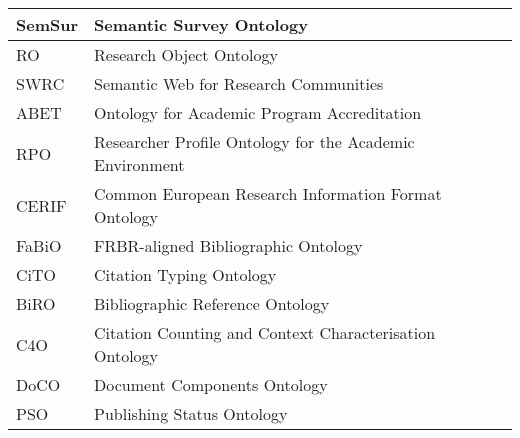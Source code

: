 \begin{table}[]
\begin{tabular}{llr}
SemSur        & Semantic Survey Ontology & \cite{DBLP:conf/i-semantics/FathallaVA018}                          \\ \midrule
RO            & Research Object Ontology & \cite{DBLP:journals/corr/BelhajjameZGHPCGBKG14}                     \\ \midrule
SWRC          & Semantic Web for Research Communities & \cite{DBLP:conf/epia/SureBHHO05}                       \\ \midrule
ABET          & Ontology for Academic Program Accreditation & \cite{10.14569/IJACSA.2016.070717}               \\ \midrule
RPO           & Researcher Profile Ontology for the Academic Environment & \cite{DBLP:conf/cvc/BravoRC19}      \\ \midrule
CERIF         & Common European Research Information Format Ontology & \cite{DBLP:journals/datascience/Jorg10} \\ \midrule
FaBiO         & FRBR-aligned Bibliographic Ontology & \cite{DBLP:journals/ws/PeroniS12}                        \\ \midrule
CiTO          & Citation Typing Ontology & \cite{DBLP:journals/ws/PeroniS12}                                   \\ \midrule
BiRO          & Bibliographic Reference Ontology & \cite{DBLP:conf/esws/IorioNPSV14}                           \\ \midrule
C4O           & Citation Counting and Context Characterisation Ontology & \cite{DBLP:conf/semweb/OsbornePM14}  \\ \midrule
DoCO          & Document Components Ontology & \cite{DBLP:journals/semweb/ConstantinPPSV16}                    \\ \midrule
PSO           & Publishing Status Ontology & \cite{DBLP:conf/i-semantics/PeroniSV12}                           \\ \midrule




\end{tabular}
\end{table}
